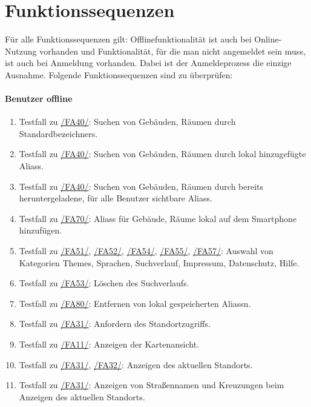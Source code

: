 \section{Funktionssequenzen}

Für alle Funktionssequenzen gilt:
Offlinefunktionalität ist auch bei Online-Nutzung vorhanden und Funktionalität, für die man nicht angemeldet sein muss, ist auch bei Anmeldung vorhanden. Dabei ist der Anmeldeprozess die einzige Ausnahme.
Folgende Funktionssequenzen sind zu überprüfen:

\paragraph{\Gls{Benutzer} offline}
\begin{enumerate}[label=\textbf{/T\arabic*0/}, align=left]
	\item \label{/T10/} Testfall zu \hyperref[/FA40/]{/FA40/}: Suchen von Gebäuden, Räumen durch \Glspl{Standardbezeichner}.
	\item \label{/T20/} Testfall zu \hyperref[/FA40/]{/FA40/}: Suchen von Gebäuden, Räumen durch \gls{lokal} hinzugefügte \Glspl{Alias}.
	\item \label{/T30/} Testfall zu \hyperref[/FA40/]{/FA40/}: Suchen von Gebäuden, Räumen durch bereits heruntergeladene, für alle Benutzer sichtbare \Glspl{Alias}.
	\item \label{/T40/} Testfall zu \hyperref[/FA70/]{/FA70/}: \Glspl{Alias} für Gebäude, Räume \gls{lokal} auf dem Smartphone hinzufügen.
	\item \label{/T50/} Testfall zu \hyperref[/FA51/]{/FA51/}, \hyperref[/FA52/]{/FA52/}, \hyperref[/FA54/]{/FA54/}, \hyperref[/FA55/]{/FA55/}, \hyperref[/FA57/]{/FA57/}: Auswahl von Kategorien \Glspl{Theme}, Sprachen, Suchverlauf, Impressum, Datenschutz, Hilfe.
	\item \label{/T60/} Testfall zu \hyperref[/FA53/]{/FA53/}: Löschen des Suchverlaufs.
	\item \label{/T70/} Testfall zu \hyperref[/FA80/]{/FA80/}: Entfernen von \gls{lokal} gespeicherten \Glspl{Alias}n.
	\item \label{/T80/} Testfall zu \hyperref[/FA31/]{/FA31/}: Anfordern des Standortzugriffs.
	\item \label{/T90/} Testfall zu \hyperref[/FA11/]{/FA11/}: Anzeigen der \Gls{Kartenansicht}.
	\item \label{/T100/} Testfall zu \hyperref[/FA31/]{/FA31/}, \hyperref[/FA32/]{/FA32/}: Anzeigen des aktuellen Standorts.
	\item \label{/T110/} Testfall zu \hyperref[/FA31/]{/FA31/}: Anzeigen von Straßennamen und Kreuzungen beim Anzeigen des aktuellen Standorts.

\end{enumerate}
